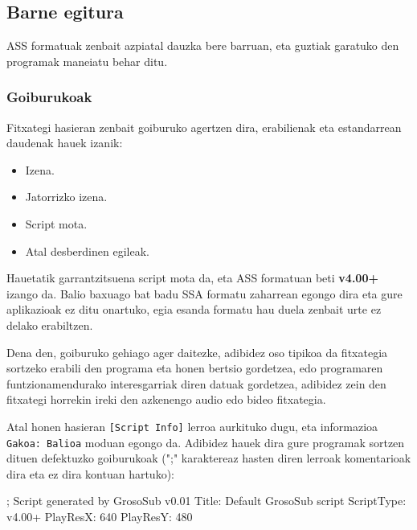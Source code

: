 \subsection{Barne egitura}
ASS formatuak zenbait azpiatal dauzka bere barruan, eta guztiak garatuko den programak maneiatu behar ditu.

\subsubsection{Goiburukoak}
Fitxategi hasieran zenbait goiburuko agertzen dira, erabilienak eta estandarrean daudenak hauek izanik:
\begin{itemize}
	\item Izena.
	\item Jatorrizko izena.
	\item Script mota.
	\item Atal desberdinen egileak.
\end{itemize}
Hauetatik garrantzitsuena script mota da, eta ASS formatuan beti \textbf{v4.00+} izango da. Balio baxuago bat badu SSA formatu zaharrean egongo dira eta gure aplikazioak ez ditu onartuko, egia esanda formatu hau duela zenbait urte ez delako erabiltzen.

Dena den, goiburuko gehiago ager daitezke, adibidez oso tipikoa da fitxategia sortzeko erabili den programa eta honen bertsio gordetzea, edo programaren funtzionamendurako interesgarriak diren datuak gordetzea, adibidez zein den fitxategi horrekin ireki den azkenengo audio edo bideo fitxategia.

Atal honen hasieran \texttt{[Script Info]} lerroa aurkituko dugu, eta informazioa \texttt{Gakoa: Balioa} moduan egongo da. Adibidez hauek dira gure programak sortzen dituen defektuzko goiburukoak (";" karaktereaz hasten diren lerroak komentarioak dira eta ez dira kontuan hartuko):
\begin{verbatimtab}
; Script generated by GrosoSub v0.01
Title: Default GrosoSub script
ScriptType: v4.00+
PlayResX: 640
PlayResY: 480
\end{verbatimtab}

